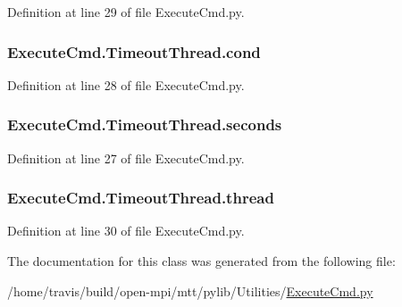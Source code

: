 Definition at line 29 of file Execute\-Cmd.\-py.

\hypertarget{class_execute_cmd_1_1_timeout_thread_ac654287e1bf651a90f45dd968e9d3c76}{
\subsubsection[{cond}]{\setlength{\rightskip}{0pt plus 5cm}Execute\-Cmd.\-Timeout\-Thread.\-cond}}\label{class_execute_cmd_1_1_timeout_thread_ac654287e1bf651a90f45dd968e9d3c76}


Definition at line 28 of file Execute\-Cmd.\-py.

\hypertarget{class_execute_cmd_1_1_timeout_thread_a93a3a333cc928cf7009ace5b8b568722}{
\subsubsection[{seconds}]{\setlength{\rightskip}{0pt plus 5cm}Execute\-Cmd.\-Timeout\-Thread.\-seconds}}\label{class_execute_cmd_1_1_timeout_thread_a93a3a333cc928cf7009ace5b8b568722}


Definition at line 27 of file Execute\-Cmd.\-py.

\hypertarget{class_execute_cmd_1_1_timeout_thread_ae8c4ccc5d51f3383f5e53c556f27cc7a}{
\subsubsection[{thread}]{\setlength{\rightskip}{0pt plus 5cm}Execute\-Cmd.\-Timeout\-Thread.\-thread}}\label{class_execute_cmd_1_1_timeout_thread_ae8c4ccc5d51f3383f5e53c556f27cc7a}


Definition at line 30 of file Execute\-Cmd.\-py.



The documentation for this class was generated from the following file\-:\begin{DoxyCompactItemize}
\item 
/home/travis/build/open-\/mpi/mtt/pylib/\-Utilities/\hyperlink{_execute_cmd_8py}{Execute\-Cmd.\-py}\end{DoxyCompactItemize}
